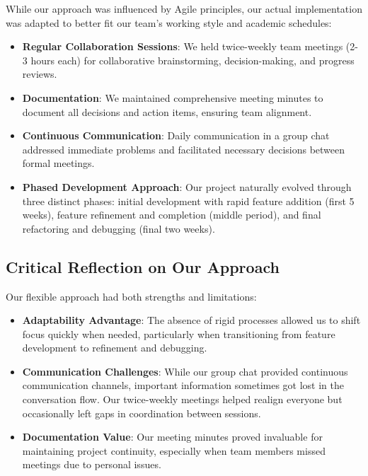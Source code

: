 While our approach was influenced by Agile principles, our actual implementation was adapted to better fit our team's working style and academic schedules:

\begin{itemize}
    \item \textbf{Regular Collaboration Sessions}: We held twice-weekly team meetings (2-3 hours each) for collaborative brainstorming, decision-making, and progress reviews.
    
    \item \textbf{Documentation}: We maintained comprehensive meeting minutes to document all decisions and action items, ensuring team alignment.
    
    \item \textbf{Continuous Communication}: Daily communication in a group chat addressed immediate problems and facilitated necessary decisions between formal meetings.
    
    \item \textbf{Phased Development Approach}: Our project naturally evolved through three distinct phases: initial development with rapid feature addition (first 5 weeks), feature refinement and completion (middle period), and final refactoring and debugging (final two weeks).
\end{itemize}

\subsection{Critical Reflection on Our Approach}

Our flexible approach had both strengths and limitations:

\begin{itemize}
    \item \textbf{Adaptability Advantage}: The absence of rigid processes allowed us to shift focus quickly when needed, particularly when transitioning from feature development to refinement and debugging.
    
    \item \textbf{Communication Challenges}: While our group chat provided continuous communication channels, important information sometimes got lost in the conversation flow. Our twice-weekly meetings helped realign everyone but occasionally left gaps in coordination between sessions.
    
    \item \textbf{Documentation Value}: Our meeting minutes proved invaluable for maintaining project continuity, especially when team members missed meetings due to personal issues.
\end{itemize}

